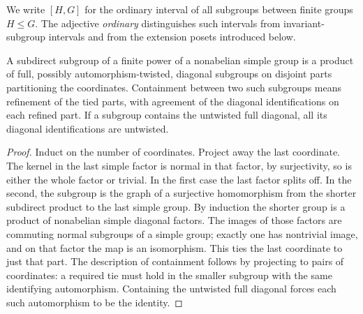 We write $[H,G]$ for the ordinary interval of all subgroups between finite
groups $H\le G$. The adjective \emph{ordinary} distinguishes such intervals
from invariant-subgroup intervals and from the extension posets introduced
below.

\begin{lemma}\label{f:lem-subdirect}
A subdirect subgroup of a finite power of a nonabelian simple group is a
product of full, possibly automorphism-twisted, diagonal subgroups on
disjoint parts partitioning the coordinates. Containment between two such
subgroups means refinement of the tied parts, with agreement of the
diagonal identifications on each refined part. If a subgroup contains the
untwisted full diagonal, all its diagonal identifications are untwisted.
\end{lemma}
\begin{proof}
Induct on the number of coordinates. Project away the last coordinate.
The kernel in the last simple factor is normal in that factor, by
surjectivity, so is either the whole factor or trivial. In the first case
the last factor splits off. In the second, the subgroup is the graph of a
surjective homomorphism from the shorter subdirect product to the last
simple group. By induction the shorter group is a product of nonabelian
simple diagonal factors. The images of those factors are commuting normal
subgroups of a simple group; exactly one has nontrivial image, and on that
factor the map is an isomorphism. This ties the last coordinate to just
that part. The description of containment follows by projecting to pairs
of coordinates: a required tie must hold in the smaller subgroup with the
same identifying automorphism. Containing the untwisted full diagonal
forces each such automorphism to be the identity.
\end{proof}

